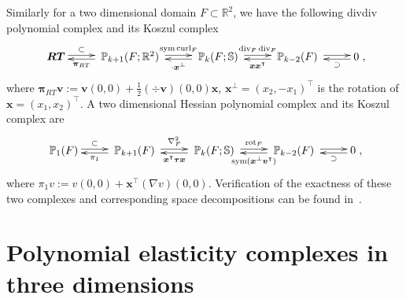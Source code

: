 
Similarly for a two dimensional domain $F\subset \mathbb R^2$, we have the following divdiv polynomial complex and its Koszul complex
\begin{equation}\label{eq:divdivcomplexPolydouble2D}
\xymatrix{
\boldsymbol{RT}\ar@<0.4ex>[r]^-{\subset} & \; \mathbb P_{k+1}(F;\mathbb R^2)\; \ar@<0.4ex>[r]^-{\sym\curl_F}\ar@<0.4ex>[l]^-{\boldsymbol \pi_{RT}}  & \; \mathbb P_k(F;\mathbb S) \ar@<0.4ex>[r]^-{\div _F {\div}_F}\; \ar@<0.4ex>[l]^-{\cdot\boldsymbol x^{\bot}} & \; \mathbb P_{k-2}(F)  \; \ar@<0.4ex>[r]^-{} \ar@<0.4ex>[l]^-{\boldsymbol x\boldsymbol x^{\intercal}}
& 0 \ar@<0.4ex>[l]^-{\supset} },
\end{equation}
where $\boldsymbol \pi_{RT}\boldsymbol  v:=\boldsymbol  v(0,0)+\frac{1}{2}(\div\boldsymbol  v)(0,0)\boldsymbol  x$, $\boldsymbol x^{\bot} = (x_2, - x_1)^{\intercal}$ is the rotation of $\boldsymbol x = (x_1, x_2)^{\intercal}$. A two dimensional Hessian polynomial complex and its Koszul complex are
\begin{equation}\label{eq:hessiancomplexPolydouble2D}
\xymatrix{
\mathbb P_1(F)\ar@<0.4ex>[r]^-{\subset} & \; \mathbb P_{k+1}(F)\; \ar@<0.4ex>[r]^-{\nabla^2_F}\ar@<0.4ex>[l]^-{\pi_1}  & \; \mathbb P_k(F;\mathbb S) \ar@<0.4ex>[r]^-{{\rm rot}_F}\; \ar@<0.4ex>[l]^-{\boldsymbol x^{\intercal}\boldsymbol \tau\boldsymbol x} & \; \mathbb P_{k-2}(F)  \; \ar@<0.4ex>[r]^-{} \ar@<0.4ex>[l]^-{\sym(\boldsymbol x^{\bot}\boldsymbol v^{\intercal})}
& 0 \ar@<0.4ex>[l]^-{\supset} },
\end{equation}
where $\pi_{1}v:=v(0,0)+\boldsymbol  x^{\intercal}(\nabla v)(0,0).$ Verification of the exactness of these two complexes and corresponding space decompositions can be found in~\cite{ChenHuang2020}.



\section{Polynomial elasticity complexes in three dimensions}

